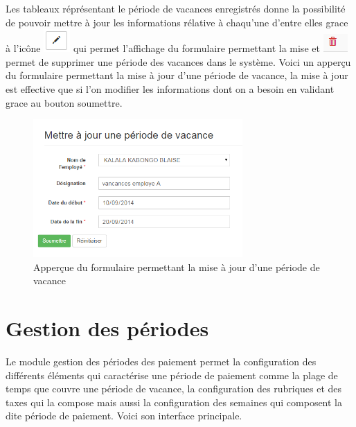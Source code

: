 \documentclass[12pt,a4paper]{report}
\begin{document}
Les tableaux réprésentant le période de vacances enregistrés donne la possibilité de pouvoir mettre à jour les informations rélative à chaqu'une d'entre elles grace à l'icône \includegraphics[scale=0.7]{pic/EditBlack.png} qui permet l'affichage du formulaire permettant la mise  et \includegraphics[scale=0.7]{pic/DeleteWRed.png} permet de supprimer une période des vacances dans le système.
Voici un apperçu du formulaire permettant la mise à jour d'une période de vacance, la mise à jour est effective que si l'on modifier les informations dont on a besoin en validant grace au bouton soumettre. 

\begin{figure}[h]
\begin{center}
\includegraphics[width=8cm]{pic/UpdateHollyD.png}
\end{center}
\caption{Apperçue du formulaire permettant la mise à jour d'une période de vacance}
\label{Apperçue du formulaire permettant la mise à jour d'une période de vacance}
\end{figure} 

\section{Gestion des périodes}
Le module gestion des périodes des paiement permet la configuration des différents éléments qui caractérise une période de paiement comme la plage de temps que couvre une période de vacance, la configuration des rubriques et des taxes qui la compose mais aussi la configuration des semaines qui composent la dite période de paiement. Voici son interface principale.
\end{document}
